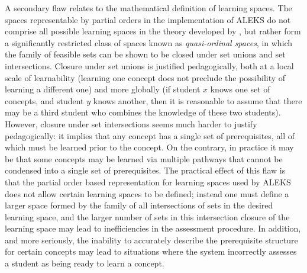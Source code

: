 \documentclass[11pt]{llncs}
\begin{document}
{A secondary flaw relates to the mathematical definition of learning spaces. The spaces representable by partial orders in the implementation of ALEKS do not comprise all possible learning spaces in the theory developed by \citet{doign99}, but rather form a significantly restricted class of spaces known as \emph{quasi-ordinal spaces}, in which the family of feasible sets can be shown to be closed under set unions and set intersections. Closure under set unions is justified pedagogically, both at a local scale of learnability (learning one concept does not preclude the possibility of learning a different one) and more globally (if student $x$ knows one set of concepts, and student $y$ knows another, then it is reasonable to assume that there may be a third student who combines the knowledge of these two students). However, closure under set intersections seems much harder to justify pedagogically: it implies that any concept has a single set of prerequisites, all of which must be learned prior to the concept. On the contrary, in practice it may be that some concepts may be learned via multiple pathways that cannot be condensed into a single set of prerequisites.  The practical effect of this flaw is that the partial order based representation for learning spaces used by ALEKS does not allow certain learning spaces to be defined; instead one must define a larger space formed by the family of all intersections of sets in the desired learning space, and the larger number of sets in this intersection closure of the learning space may lead to inefficiencies in the assessment procedure. In addition, and more seriously, the inability to accurately describe the prerequisite structure for certain concepts may lead to situations where the system incorrectly assesses a student as being ready to learn a concept.

}
\end{document}
